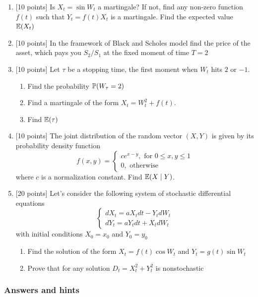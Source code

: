 \documentclass[pdftex,12pt,a4paper]{article}
\begin{document}
\begin{enumerate}

\item $[$10 points] Is $X_t=\sin W_t$ a martingale? If not, find any non-zero function $f(t)$ such that $Y_t=f(t)X_t$ is a martingale. Find the expected value $\E(X_t)$

\item  $[$10 points] In the framework of Black and Scholes model find the price of the asset, which pays you $S_2/S_1$ at the fixed moment of time $T=2$

\item $[$10 points] Let $\tau$ be a stopping time, the first moment when $W_t$ hits $2$ or $-1$.
\begin{enumerate}
\item Find the probability $\P( W_{\tau} = 2)$
\item Find a martingale of the form $X_t=W_t^2+f(t)$.
\item Find $\E(\tau)$
\end{enumerate}

\item $[$10 points]  The joint distribution of the random vector $(X,Y)$ is given by its probability density function
\[
f(x,y)=
\left\{
  \begin{array}{l}
    c e^{x-y}, \text{ for } 0\leq x,y\leq 1 \\
    0, \text{ otherwise}    
  \end{array}
\right.
\]
where $c$ is a normalization constant. Find $\E(X\mid Y)$.

\item $[$20 points] Let’s consider the following system of stochastic differential equations
\[
\left\{
  \begin{array}{l}
    dX_t=aX_t dt-Y_t dW_t \\
    dY_t=aY_t dt+X_t dW_t
  \end{array}
\right.
\]
with initial conditions $X_0=x_0$ and $Y_0=y_0$ 
\begin{enumerate}
\item Find the solution of the form $X_t=f(t)\cos W_t$ and $Y_t=g(t)\sin W_t$ 
\item Prove that for any solution $D_t=X_t^2+Y_t^2$ is nonstochastic
\end{enumerate}

\end{enumerate}

\subsubsection*{Answers and hints}
\end{document}
